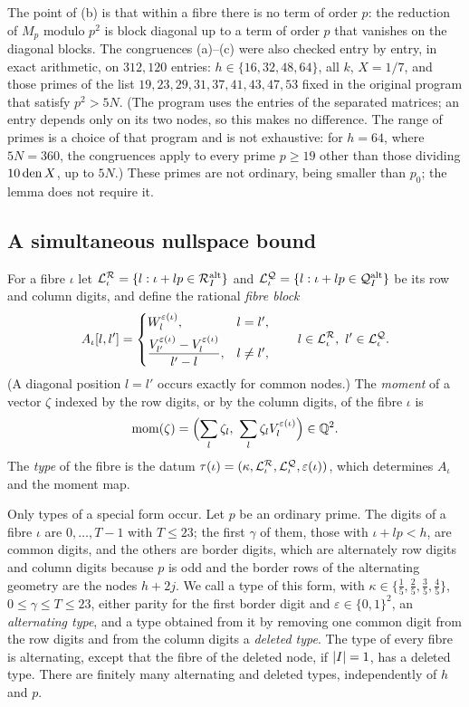 The point of (b) is that within a fibre there is no term of order $p$: the reduction of $M_p$
modulo $p^2$ is block diagonal up to a term of order $p$ that vanishes on the diagonal blocks.
The congruences (a)--(c) were also checked entry by entry, in exact arithmetic, on $312{,}120$
entries: $h\in\{16,32,48,64\}$, all $k$, $X=1/7$, and those primes of the list
$19,23,29,31,37,41,43,47,53$ fixed in the original program that satisfy $p^2>5N$. (The program
uses the entries of the separated matrices; an entry depends only on its two nodes, so this makes
no difference. The range of primes is a choice of that program and is not exhaustive: for $h=64$,
where $5N=360$, the congruences apply to every prime $p\ge19$ other than those dividing $10\operatorname{den} X$,
up to $5N$.) These primes are not ordinary, being smaller than $p_0$; the lemma does not require
it.

\subsection{A simultaneous nullspace bound}\label{subsec:nullspace}

For a fibre $\iota$ let $\mathcal L^{\mathcal{R}}_\iota=\{l:\iota+lp\in\mathcal{R}^{\mathrm{alt}}_I\}$ and
$\mathcal L^{\mathcal{Q}}_\iota=\{l:\iota+lp\in\mathcal{Q}^{\mathrm{alt}}_I\}$ be its row and column digits, and define the
rational \emph{fibre block}
\[
  A_\iota[l,l']=\begin{cases}W^{\varepsilon(\iota)}_l,&l=l',\\[1mm]
  \dfrac{V^{\varepsilon(\iota)}_{l'}-V^{\varepsilon(\iota)}_l}{l'-l},&l\ne l',\end{cases}
  \qquad l\in\mathcal L^{\mathcal{R}}_\iota,\ l'\in\mathcal L^{\mathcal{Q}}_\iota .
\]
(A diagonal position $l=l'$ occurs exactly for common nodes.) The \emph{moment} of a vector
$\zeta$ indexed by the row digits, or by the column digits, of the fibre $\iota$ is
\[
  \operatorname{mom}(\zeta)=\Bigl(\sum_l\zeta_l,\ \sum_l\zeta_lV^{\varepsilon(\iota)}_l\Bigr)\in\Q^2 .
\]
The \emph{type} of the fibre is the datum
$\tau(\iota)=(\kappa,\mathcal L^{\mathcal{R}}_\iota,\mathcal L^{\mathcal{Q}}_\iota,\varepsilon(\iota))$, which
determines $A_\iota$ and the moment map.

Only types of a special form occur. Let $p$ be an ordinary prime. The digits of a fibre $\iota$
are $0,\dots,T-1$ with $T\le23$; the first $\gamma$ of them, those with $\iota+lp<h$, are common
digits, and the others are border digits, which are alternately row digits and column digits
because $p$ is odd and the border rows of the alternating geometry are the nodes $h+2j$. We call
a type of this form, with $\kappa\in\{\frac15,\frac25,\frac35,\frac45\}$, $0\le\gamma\le T\le23$,
either parity for the first border digit and $\varepsilon\in\{0,1\}^2$, an \emph{alternating
type}, and a type obtained from it by removing one common digit from the row digits and from the
column digits a \emph{deleted type}. The type of every fibre is alternating, except that the fibre
of the deleted node, if $\lvert I\rvert=1$, has a deleted type. There are finitely many alternating and
deleted types, independently of $h$ and $p$.

